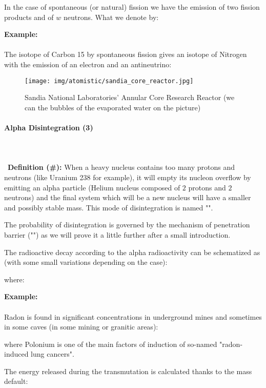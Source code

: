 	In the case of spontaneous (or natural) fission we have the emission of two fission products and of $w$ neutrons. What we denote by:
	
	\begin{tcolorbox}[colframe=black,colback=white,sharp corners]
	\textbf{{\Large {}}Example:}\\\\
	The isotope of Carbon 15 by spontaneous fission gives an isotope of Nitrogen with the emission of an electron and an antineutrino:
	
	\end{tcolorbox}
	\begin{figure}[H]
		\centering
		\texttt{[image: img/atomistic/sandia\_core\_reactor.jpg]}
		\caption[]{Sandia National Laboratories' Annular Core Research Reactor (we can the bubbles of the evaporated water on the picture)}
	\end{figure}
	
	\paragraph{Alpha Disintegration (3)}\label{alpha disintegration}\mbox{}\\\\\
	\textbf{Definition (\#\mydef):} When a heavy nucleus contains too many protons and neutrons (like Uranium 238 for example), it will empty its nucleon overflow by emitting an alpha particle (Helium nucleus composed of $2$ protons and $2$ neutrons) and the final system which will be a new nucleus will have a smaller and possibly stable mass. This mode of disintegration is named "".
	
	The probability of disintegration is governed by the mechanism of penetration barrier ("") as we will prove it a little further after a small introduction.

	The radioactive decay according to the alpha radioactivity can be schematized as (with some small variations depending on the case):
	
	where:
	
	\begin{tcolorbox}[colframe=black,colback=white,sharp corners]
	\textbf{{\Large {}}Example:}\\\\
	Radon is found in significant concentrations in underground mines and sometimes in some caves (in some mining or granitic areas):
	
	where Polonium is one of the main factors of induction of so-named "radon-induced lung cancers".
	\end{tcolorbox}
	The energy released during the transmutation is calculated thanks to the mass default:
	

